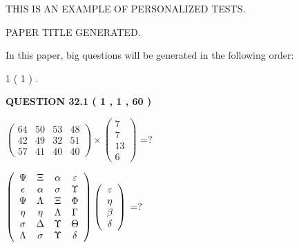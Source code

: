 \documentclass[12pt]{article}
\begin{document}
   
   
   
   
   
   
   
 \vspace{0.2in}
{\Huge  THIS IS AN EXAMPLE OF}
{\Huge  PERSONALIZED TESTS. }
   
   
 PAPER TITLE GENERATED.
   
   
   
\vspace{0.2in}
   
In this paper, big questions will be generated in the following order: 
   
   
             1 (           1 )
 .
  
\vspace{0.2in}
  
{\textbf{\Large{QUESTION
32.1 
 (           1 ,           1 ,          60 )
}}}
  
  
 
$ \left( \begin{array}{ccccccccc}
          64  & 
          50  & 
          53  & 
          48  \\ 
          42  & 
          49  & 
          32  & 
          51  \\ 
          57  & 
          41  & 
          40  & 
          40
\end{array}\right) \times
\left( \begin{array}{c}
           7  \\ 
           7  \\ 
          13  \\ 
           6
\end{array}\right) $ =?
 
 
$  %
 \left( \begin{array}
 {
 c
 c
 c
 c
 }
 \Psi & 
                    \Xi & 
 \alpha & 
 \varepsilon \\ 
 \epsilon & 
 \alpha & 
 \sigma & 
 \Upsilon \\ 
 \Psi & 
 \Lambda & 
                    \Xi & 
 \Phi \\ 
 \eta & 
 \eta & 
 \Lambda & 
 \Gamma \\ 
 \sigma & 
 \Delta & 
 \Upsilon & 
 \Theta \\ 
 \Lambda & 
 \sigma & 
 \Upsilon & 
 \delta
 \end{array} \right)
 \left( \begin{array}
 {
 c
 }
 \varepsilon \\ 
 \eta \\ 
 \beta \\ 
 \delta
 \end{array} \right)
$ =?
 
\end{document}
